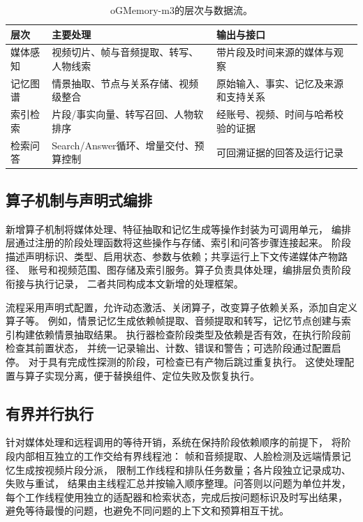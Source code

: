 \documentclass[UTF8,a4paper,11pt,fontset=fandol]{ctexart}
\newcommand*{\memoryprojectname}{oGMemory}
\newcommand*{\memoryprojectnamemthree}{\memoryprojectname-m3}
\begin{document}
\begin{table}[htbp]
\centering\small
\caption{\memoryprojectnamemthree{}的层次与数据流。}
\label{tab:architecture}
\begin{tabularx}{\linewidth}{lXX}
\toprule
层次 & 主要处理 & 输出与接口\\
\midrule
媒体感知 & 视频切片、帧与音频提取、转写、人物线索 & 带片段及时间来源的媒体与观察\\
记忆图谱 & 情景抽取、节点与关系存储、视频级整合 & 原始输入、事实、记忆及来源和支持关系\\
索引检索 & 片段/事实向量、转写召回、人物软排序 & 经账号、视频、时间与哈希校验的证据\\
检索问答 & Search/Answer循环、增量交付、预算控制 & 可回溯证据的回答及运行记录\\
\bottomrule
\end{tabularx}
\end{table}

\subsection{算子机制与声明式编排}
新增算子机制将媒体处理、特征抽取和记忆生成等操作封装为可调用单元，
编排层通过注册的阶段处理函数将这些操作与存储、索引和问答步骤连接起来。
阶段描述声明标识、类型、启用状态、参数与依赖；共享运行上下文传递媒体产物路径、
账号和视频范围、图存储及索引服务。算子负责具体处理，编排层负责阶段衔接与执行记录，
二者共同构成本文新增的处理框架。

流程采用声明式配置，允许动态激活、关闭算子，改变算子依赖关系，添加自定义算子等。
例如，情景记忆生成依赖帧提取、音频提取和转写，记忆节点创建与索引构建依赖情景抽取结果。
执行器检查阶段类型及依赖是否有效，在执行阶段前检查其前置状态，
并统一记录输出、计数、错误和警告；可选阶段通过配置启停。
对于具有完成性探测的阶段，可检查已有产物后跳过重复执行。
这使处理配置与算子实现分离，便于替换组件、定位失败及恢复执行。

\subsection{有界并行执行}
针对媒体处理和远程调用的等待开销，系统在保持阶段依赖顺序的前提下，
将阶段内部相互独立的工作交给有界线程池：
帧和音频提取、人脸检测及远端情景记忆生成按视频片段分派，
限制工作线程和排队任务数量；各片段独立记录成功、失败与重试，
结果由主线程汇总并按输入顺序整理。问答则以问题为单位并发，
每个工作线程使用独立的适配器和检索状态，完成后按问题标识及时写出结果，
避免等待最慢的问题，也避免不同问题的上下文和预算相互干扰。
\end{document}
